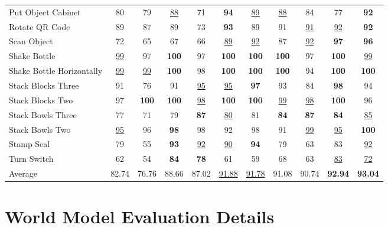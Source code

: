 \begin{center}
\begin{minipage}{\linewidth}
\begin{tabular*}{\linewidth}{@{\extracolsep{\fill}}l*{10}{c}@{}}
        Put Object Cabinet & 80 & 79 & \underline{88} & 71 & \textbf{94} & \underline{89} & \underline{88} & 84 & 77 & \textbf{92} \\
        Rotate QR Code & 89 & 87 & 89 & 73 & \textbf{93} & 89 & 91 & \underline{91} & \underline{92} & \textbf{92} \\
        Scan Object & 72 & 65 & 67 & 66 & \underline{89} & \underline{92} & 87 & \underline{92} & \textbf{97} & \textbf{96} \\
        Shake Bottle & \underline{99} & 97 & \textbf{100} & 97 & \textbf{100} & \textbf{100} & \textbf{100} & 97 & \textbf{100} & \underline{99} \\
        Shake Bottle Horizontally & \underline{99} & \underline{99} & \textbf{100} & 98 & \textbf{100} & \textbf{100} & \textbf{100} & 94 & \textbf{100} & \textbf{100} \\
        Stack Blocks Three & 91 & 76 & 91 & \underline{95} & \underline{95} & \textbf{97} & 93 & 84 & \textbf{98} & 94 \\
        Stack Blocks Two & 97 & \textbf{100} & \textbf{100} & \underline{98} & \textbf{100} & \textbf{100} & \underline{99} & \underline{98} & \textbf{100} & 96 \\
        Stack Bowls Three & 77 & 71 & 79 & \textbf{87} & \underline{80} & 81 & \textbf{84} & \textbf{87} & \textbf{84} & \underline{85} \\
        Stack Bowls Two & \underline{95} & 96 & \textbf{98} & 98 & 92 & 98 & 91 & \underline{99} & \underline{95} & \textbf{100} \\
        Stamp Seal & 79 & 55 & \textbf{93} & \underline{92} & \underline{90} & \textbf{94} & 79 & 63 & 83 & \underline{92} \\
        Turn Switch & 62 & 54 & \textbf{84} & \textbf{78} & 61 & 59 & 68 & 63 & \underline{83} & \underline{72} \\
        \midrule
        Average & 82.74 & 76.76 & 88.66 & 87.02 & \underline{91.88} & \underline{91.78} & 91.08 & 90.74 & \textbf{92.94} & \textbf{93.04} \\
        \bottomrule
    \end{tabular*}
\end{minipage}
\end{center}


\section{World Model Evaluation Details}
\label{app:world_model_protocol}

